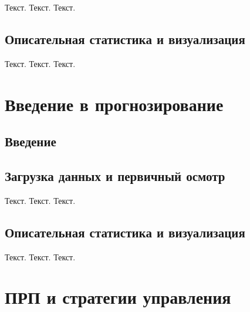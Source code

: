 \documentclass[
  letterpaper,
  DIV=11,
  numbers=noendperiod]{scrreprt}
\begin{document}
Текст. Текст. Текст.

\section{Описательная статистика и
визуализация}\label{ux43eux43fux438ux441ux430ux442ux435ux43bux44cux43dux430ux44f-ux441ux442ux430ux442ux438ux441ux442ux438ux43aux430-ux438-ux432ux438ux437ux443ux430ux43bux438ux437ux430ux446ux438ux44f-2}

Текст. Текст. Текст.


\chapter{Введение в
прогнозирование}\label{ux432ux432ux435ux434ux435ux43dux438ux435-ux432-ux43fux440ux43eux433ux43dux43eux437ux438ux440ux43eux432ux430ux43dux438ux435}

\section{Введение}\label{ux432ux432ux435ux434ux435ux43dux438ux435-6}

\section{Загрузка данных и первичный
осмотр}\label{ux437ux430ux433ux440ux443ux437ux43aux430-ux434ux430ux43dux43dux44bux445-ux438-ux43fux435ux440ux432ux438ux447ux43dux44bux439-ux43eux441ux43cux43eux442ux440-2}

Текст. Текст. Текст.

\section{Описательная статистика и
визуализация}\label{ux43eux43fux438ux441ux430ux442ux435ux43bux44cux43dux430ux44f-ux441ux442ux430ux442ux438ux441ux442ux438ux43aux430-ux438-ux432ux438ux437ux443ux430ux43bux438ux437ux430ux446ux438ux44f-3}

Текст. Текст. Текст.


\chapter{ПРП и стратегии
управления}\label{ux43fux440ux43f-ux438-ux441ux442ux440ux430ux442ux435ux433ux438ux438-ux443ux43fux440ux430ux432ux43bux435ux43dux438ux44f}
\end{document}
